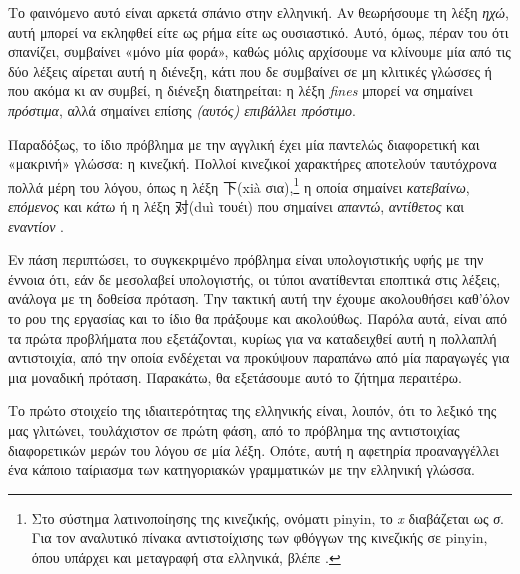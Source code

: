 \documentclass [a4paper,11pt] {book}
\theoremstyle{definition}
\theoremstyle{definition}
\begin{document}
Το φαινόμενο αυτό είναι αρκετά σπάνιο στην ελληνική. Αν θεωρήσουμε τη λέξη \textit{ηχώ}, αυτή μπορεί να εκληφθεί είτε ως ρήμα είτε ως ουσιαστικό. Αυτό, όμως, πέραν του ότι σπανίζει, συμβαίνει «μόνο μία φορά», καθώς μόλις αρχίσουμε να κλίνουμε μία από τις δύο λέξεις αίρεται αυτή η διένεξη, κάτι που δε συμβαίνει σε μη κλιτικές γλώσσες ή που ακόμα κι αν συμβεί, η διένεξη διατηρείται: η λέξη \textit{fines} μπορεί να σημαίνει \textit{πρόστιμα}, αλλά σημαίνει επίσης \textit{(αυτός) επιβάλλει πρόστιμο}.

Παραδόξως, το ίδιο πρόβλημα με την αγγλική έχει μία παντελώς διαφορετική και «μακρινή» γλώσσα: η κινεζική. Πολλοί κινεζικοί χαρακτήρες αποτελούν ταυτόχρονα πολλά μέρη του λόγου, όπως η λέξη 下(xià σια),\footnote{Στο σύστημα λατινοποίησης της κινεζικής, ονόματι pinyin, το \textit{x} διαβάζεται ως \textit{σ}. Για τον αναλυτικό πίνακα αντιστοίχισης των φθόγγων της κινεζικής σε pinyin, όπου υπάρχει και μεταγραφή στα ελληνικά, βλέπε \citep{chalikias}.} η οποία σημαίνει \textit{κατεβαίνω}, \textit{επόμενος} και \textit{κάτω} ή η λέξη 对(duì τουέι) που σημαίνει \textit{απαντώ}, \textit{αντίθετος} και \textit{εναντίον}
 \citep{wu2001new}.

Εν πάση περιπτώσει, το συγκεκριμένο πρόβλημα είναι υπολογιστικής υφής με την έννοια ότι, εάν δε μεσολαβεί υπολογιστής, οι τύποι ανατίθενται εποπτικά στις λέξεις, ανάλογα με τη δοθείσα πρόταση. Την τακτική αυτή την έχουμε ακολουθήσει καθ'όλον το ρου της εργασίας και το ίδιο θα πράξουμε και ακολούθως. Παρόλα αυτά, είναι από τα πρώτα προβλήματα που εξετάζονται, κυρίως για να καταδειχθεί αυτή η πολλαπλή αντιστοιχία, από την οποία ενδέχεται να προκύψουν παραπάνω από μία παραγωγές για μια μοναδική πρόταση. Παρακάτω, θα εξετάσουμε αυτό το ζήτημα περαιτέρω.

Το πρώτο στοιχείο της ιδιαιτερότητας της ελληνικής είναι, λοιπόν, ότι το λεξικό της μας γλιτώνει, τουλάχιστον σε πρώτη φάση, από το πρόβλημα της αντιστοιχίας διαφορετικών μερών του λόγου σε μία λέξη. Οπότε, αυτή η αφετηρία προαναγγέλλει ένα κάποιο ταίριασμα των κατηγοριακών γραμματικών με την ελληνική γλώσσα. 
\end{document}
